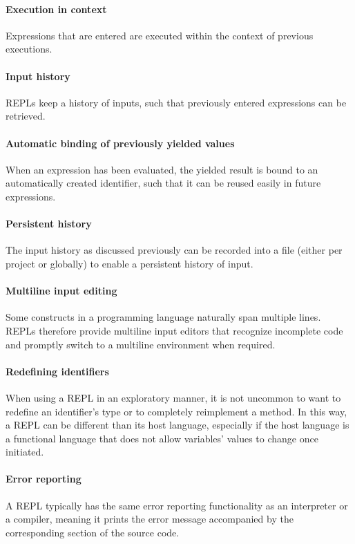 \paragraph{Execution in context} Expressions that are entered are executed
within the context of previous executions.

\paragraph{Input history} REPLs keep a history of inputs, such that previously
entered expressions can be retrieved.

\paragraph{Automatic binding of previously yielded values} When an expression
has been evaluated, the yielded result is bound to an automatically created
identifier, such that it can be reused easily in future expressions.

\paragraph{Persistent history} The input history as discussed previously can be
recorded into a file (either per project or globally) to enable a persistent
history of input.

\paragraph{Multiline input editing} Some constructs in a programming language
naturally span multiple lines. REPLs therefore provide multiline input editors
that recognize incomplete code and promptly switch to a multiline environment
when required.

\paragraph{Redefining identifiers} When using a REPL in an exploratory manner,
it is not uncommon to want to redefine an identifier's type or to completely
reimplement a method. In this way, a REPL can be different than its host
language, especially if the host language is a functional language that does not
allow variables' values to change once initiated.

\paragraph{Error reporting} A REPL typically has the same error reporting
functionality as an interpreter or a compiler, meaning it prints the error
message accompanied by the corresponding section of the source code.

